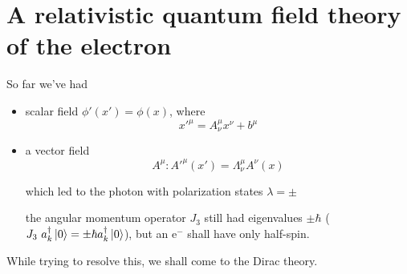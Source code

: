 \documentclass[11pt]{article}
\begin{document}
	\section*{A relativistic quantum field theory of the electron}
	So far we've had \begin{itemize}
		\item scalar field $\phi'(x') = \phi(x)$, where \[ x'^{\mu} = A^\mu_\nu x^\nu + b^\mu\]
		
		\item a vector field \[ A^\mu: A'^\mu (x') = \Lambda^\mu_\nu A^\nu (x)\]
		
		which led to the photon with polarization states $\lambda = \pm $
		
		the angular momentum operator $J_3$ still had eigenvalues $\pm \hbar$ ($J_3\ a_k^\dagger\ket{0} = \pm \hbar a_k^\dagger\ket{0}$), but an e$^-$ shall have only half-spin.
	\end{itemize} 

	While trying to resolve this, we shall come to the Dirac theory.
	
\end{document}
